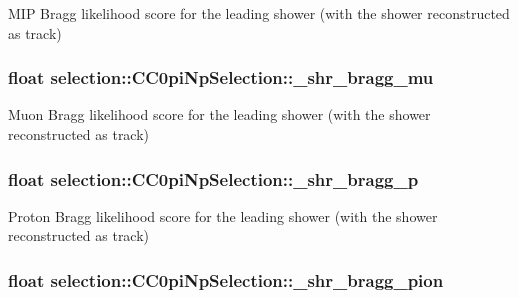 M\-I\-P Bragg likelihood score for the leading shower (with the shower reconstructed as track) \hypertarget{classselection_1_1CC0piNpSelection_a6ef67d022fce5058985773010161b7cb}{
\subsubsection[{\-\_\-shr\-\_\-bragg\-\_\-mu}]{\setlength{\rightskip}{0pt plus 5cm}float selection\-::\-C\-C0pi\-Np\-Selection\-::\-\_\-shr\-\_\-bragg\-\_\-mu\hspace{0.3cm}{\ttfamily [private]}}}\label{classselection_1_1CC0piNpSelection_a6ef67d022fce5058985773010161b7cb}
Muon Bragg likelihood score for the leading shower (with the shower reconstructed as track) \hypertarget{classselection_1_1CC0piNpSelection_acb447ca93f046abd1540291ba0d41e73}{
\subsubsection[{\-\_\-shr\-\_\-bragg\-\_\-p}]{\setlength{\rightskip}{0pt plus 5cm}float selection\-::\-C\-C0pi\-Np\-Selection\-::\-\_\-shr\-\_\-bragg\-\_\-p\hspace{0.3cm}{\ttfamily [private]}}}\label{classselection_1_1CC0piNpSelection_acb447ca93f046abd1540291ba0d41e73}
Proton Bragg likelihood score for the leading shower (with the shower reconstructed as track) \hypertarget{classselection_1_1CC0piNpSelection_afa97d9a456bf2255e06c6c5226f25929}{
\subsubsection[{\-\_\-shr\-\_\-bragg\-\_\-pion}]{\setlength{\rightskip}{0pt plus 5cm}float selection\-::\-C\-C0pi\-Np\-Selection\-::\-\_\-shr\-\_\-bragg\-\_\-pion\hspace{0.3cm}{\ttfamily [private]}}}\label{classselection_1_1CC0piNpSelection_afa97d9a456bf2255e06c6c5226f25929}
